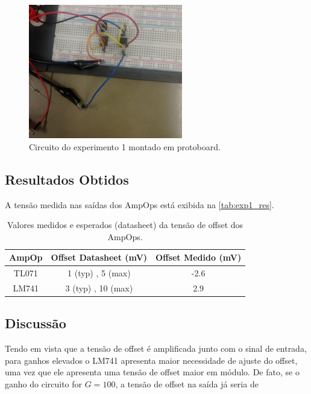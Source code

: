 \documentclass[
	12pt,				%
	oneside,			%
	a4paper,			%
	chapter=TITLE,
	sumario=tradicional,
	english,			%
	brazil				%
]{abntex2}
\begin{document}
\begin{figure}[h!]
	\caption{\label{fig:exp1_circ_pb} Circuito do experimento 1 montado em protoboard.}
	\begin{center}
    \includegraphics[width=0.6\textwidth,trim=1 1 1 1,clip]{images/Pratica4/exp1_circ_pb.png}
	\end{center}
\end{figure}



\subsection{Resultados Obtidos}

A tensão medida nas saídas dos AmpOps está exibida na \autoref{tab:exp1_res}.

\begin{table}[htb]
	\caption{Valores medidos e esperados (datasheet) da tensão de offset dos AmpOps.}
	\centering
	\begin{tabular}{c|c|c}
		\hline
    		\textbf{AmpOp}  & \textbf{Offset Datasheet (mV)} & \textbf{Offset Medido (mV)} \\
            \hline
    		TL071 & 1 (typ) , 5 (max) & -2.6 \\
            \hline
            LM741 & 3 (typ) , 10 (max) & 2.9 \\
            \hline
	\end{tabular}
	\label{tab:exp1_res}
\end{table}

\subsection{Discussão}

Tendo em vista que a tensão de offset é amplificada junto com o sinal de entrada, para ganhos elevados o 
LM741 apresenta maior necessidade de ajuste do offset, uma vez que ele apresenta uma tensão de offset maior 
em módulo. De fato, se o ganho do circuito for $G = 100$, a tensão de offset na saída já seria 
de 
\end{document}

